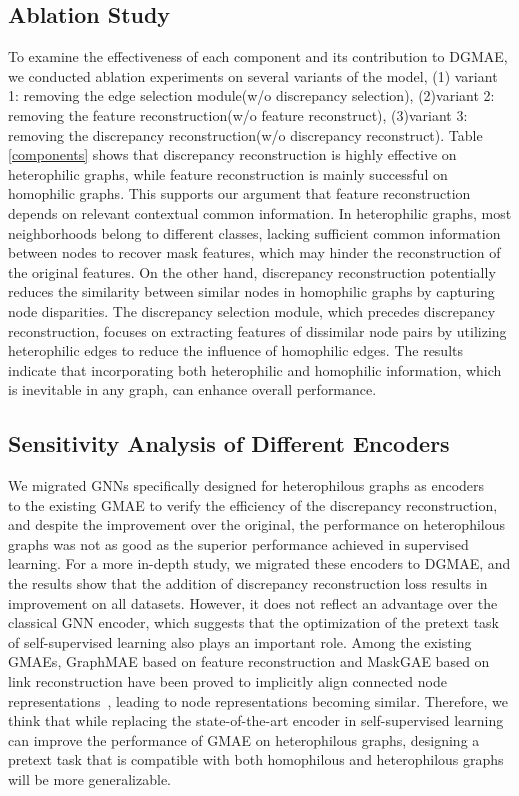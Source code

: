 \documentclass[sigconf]{acmart}
\begin{document}
\subsection{Ablation Study}
To examine the effectiveness of each component and its contribution to DGMAE, we conducted ablation experiments on several variants of the model, (1) variant 1: removing the edge selection module(w/o discrepancy selection), (2)variant 2: removing the feature reconstruction(w/o feature reconstruct), (3)variant 3: removing the discrepancy reconstruction(w/o discrepancy reconstruct). Table \ref{components} shows that discrepancy reconstruction is highly effective on heterophilic graphs, while feature reconstruction is mainly successful on homophilic graphs. This supports our argument that feature reconstruction depends on relevant contextual common information. In heterophilic graphs, most neighborhoods belong to different classes, lacking sufficient common information between nodes to recover mask features, which may hinder the reconstruction of the original features. On the other hand, discrepancy reconstruction potentially reduces the similarity between similar nodes in homophilic graphs by capturing node disparities. The discrepancy selection module, which precedes discrepancy reconstruction, focuses on extracting features of dissimilar node pairs by utilizing heterophilic edges to reduce the influence of homophilic edges. The results indicate that incorporating both heterophilic and homophilic information, which is inevitable in any graph, can enhance overall performance.

\subsection{Sensitivity Analysis of Different Encoders}
We migrated GNNs specifically designed for heterophilous graphs as encoders ~\cite{h2gnn,aero-gnn} to the existing GMAE to verify the efficiency of the discrepancy reconstruction, and despite the improvement over the original, the performance on heterophilous graphs was not as good as the superior performance achieved in supervised learning. For a more in-depth study, we migrated these encoders to DGMAE, and the results show that the addition of discrepancy reconstruction loss results in improvement on all datasets. However, it does not reflect an advantage over the classical GNN encoder, which suggests that the optimization of the pretext task of self-supervised learning also plays an important role. Among the existing GMAEs, GraphMAE based on feature reconstruction and MaskGAE based on link reconstruction have been proved to implicitly align connected node representations~\cite{augmae}, leading to node representations becoming similar. Therefore, we think that while replacing the state-of-the-art encoder in self-supervised learning can improve the performance of GMAE on heterophilous graphs, designing a pretext task that is compatible with both homophilous and heterophilous graphs will be more generalizable.
\end{document}
